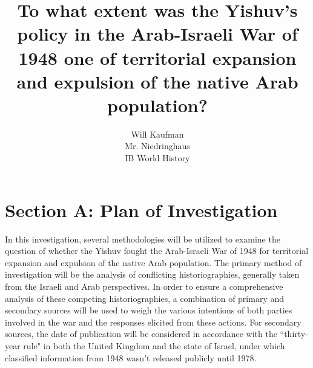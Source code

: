 \documentclass[11pt]{turabian-researchpaper}
\begin{document}
\title{To what extent was the Yishuv's policy in the Arab-Israeli War of 1948 one of territorial expansion and expulsion of the native Arab population?}

\author{Will Kaufman \\ Mr. Niedringhaus \\ IB World History}
\maketitle



\section{Section A: Plan of Investigation}
In this investigation, several methodologies will be utilized to examine the question of whether the Yishuv fought the Arab-Israeli War of 1948 for territorial expansion and expulsion of the native Arab population.  The primary method of investigation will be the analysis of conflicting historiographies, generally taken from the Israeli and Arab perspectives.  In order to ensure a comprehensive analysis of these competing historiographies, a combination of primary and secondary sources will be used to weigh the various intentions of both parties involved in the war and the responses elicited from these actions.  For secondary sources, the date of publication will be considered in accordance with the ``thirty-year rule" in both the United Kingdom and the state of Israel, under which classified information from 1948 wasn’t released publicly until 1978.

\end{document}
